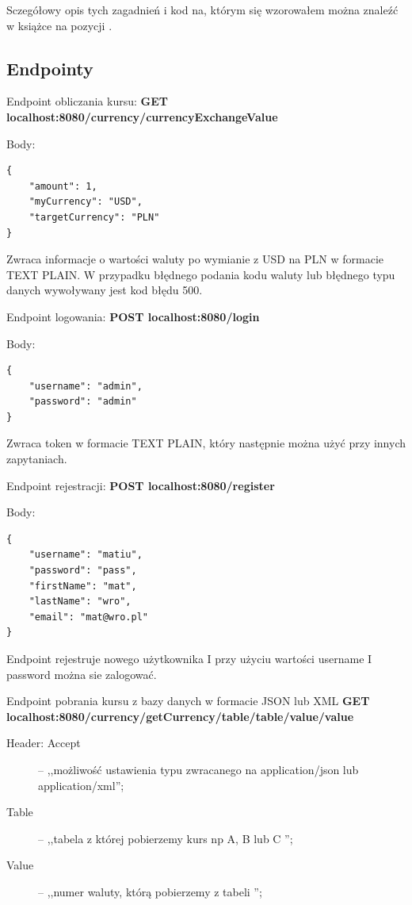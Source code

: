 \documentclass{iiuwb}
\begin{document}
Sczegółowy opis tych zagadnień i kod na, którym się wzorowałem można znaleźć w książce na pozycji \cite{Quarkus}.

\subsection{Endpointy}
\label{sec:endpointy}

Endpoint obliczania kursu: \textbf{GET localhost:8080/currency/currencyExchangeValue}

Body:  

\begin{lstlisting}[breaklines=true]
{ 
    "amount": 1, 
    "myCurrency": "USD", 
    "targetCurrency": "PLN"
} 
\end{lstlisting}

Zwraca informacje o wartości waluty po wymianie z USD na PLN w formacie TEXT PLAIN. W przypadku błędnego podania kodu waluty lub błędnego typu danych wywoływany jest kod błędu 500. \newline

Endpoint logowania: \textbf{POST localhost:8080/login} 

Body: 
\begin{lstlisting}[breaklines=true]
{ 
    "username": "admin", 
    "password": "admin" 
} 
\end{lstlisting}

Zwraca token w formacie TEXT PLAIN, który następnie można użyć przy innych zapytaniach. \newline

Endpoint rejestracji: \textbf{POST localhost:8080/register} 

Body: 
\begin{lstlisting}[breaklines=true]
{ 
    "username": "matiu", 
    "password": "pass", 
    "firstName": "mat", 
    "lastName": "wro", 
    "email": "mat@wro.pl" 
} 
\end{lstlisting}

Endpoint rejestruje nowego użytkownika I przy użyciu wartości username I password można sie zalogować. \newline

Endpoint pobrania kursu z bazy danych w formacie JSON lub XML \textbf{GET localhost:8080/currency/getCurrency/table/{table}/value/{value}}

\begin{description}
  \item[Header: Accept] -- ,,możliwość ustawienia typu zwracanego na application/json lub application/xml'';
  \item[Table]  -- ,,tabela z której pobierzemy kurs np A, B lub C '';
  \item[Value]  -- ,,numer waluty, którą pobierzemy z tabeli '';
\end{description}
\end{document}
